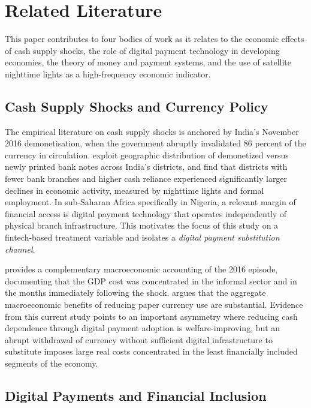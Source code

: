 
\section{Related Literature}
\label{sec:literature}

This paper contributes to four bodies of work as it relates to the economic effects of
cash supply shocks, the role of digital payment technology in developing
economies, the theory of money and payment systems, and the use of satellite
nighttime lights as a high-frequency economic indicator.

\subsection{Cash Supply Shocks and Currency Policy}

The empirical literature on cash supply shocks is anchored by India's
November 2016 demonetisation, when the government abruptly invalidated
86 percent of the currency in circulation. \citet{chodorow2020cash} exploit
geographic distribution of demonetized versus newly printed 
bank notes across India's districts, and find that districts with fewer
bank branches and higher cash reliance experienced significantly larger
declines in economic activity, measured by nighttime lights and formal
employment. In sub-Saharan Africa specifically in Nigeria, a relevant margin of 
financial access is  digital
payment technology that operates independently of physical branch
infrastructure. This motivates the focus of this study on a fintech-based
treatment variable and isolates a \emph{digital payment substitution channel}.

\citet{lahiri2020demonetization} provides a complementary macroeconomic
accounting of the 2016 episode, documenting that the GDP cost was concentrated
in the informal sector and in the months immediately following the shock.
\citet{rogoff2015costs} argues that the aggregate macroeconomic benefits of
reducing paper currency use are substantial.  Evidence from this current study points to an
important asymmetry where reducing cash dependence through digital payment adoption is
welfare-improving, but an abrupt withdrawal of currency without sufficient
digital infrastructure to substitute imposes large real costs concentrated in
the least financially included segments of the economy.

\subsection{Digital Payments and Financial Inclusion}

